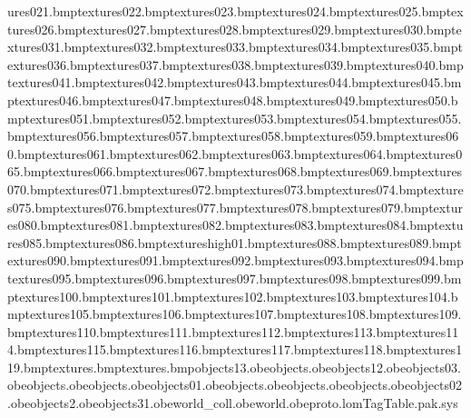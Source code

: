 ures\tstbg021.bmp textures\tstbg022.bmp textures\tstbg023.bmp textures\tstbg024.bmp textures\tstbg025.bmp textures\tstbg026.bmp textures\tstbg027.bmp textures\tstbg028.bmp textures\tstbg029.bmp textures\tstbg030.bmp textures\tstbg031.bmp textures\tstbg032.bmp textures\tstbg033.bmp textures\tstbg034.bmp textures\tstbg035.bmp textures\tstbg036.bmp textures\tstbg037.bmp textures\tstbg038.bmp textures\tstbg039.bmp textures\tstbg040.bmp textures\tstbg041.bmp textures\tstbg042.bmp textures\tstbg043.bmp textures\tstbg044.bmp textures\tstbg045.bmp textures\tstbg046.bmp textures\tstbg047.bmp textures\tstbg048.bmp textures\tstbg049.bmp textures\tstbg050.bmp textures\tstbg051.bmp textures\tstbg052.bmp textures\tstbg053.bmp textures\tstbg054.bmp textures\tstbg055.bmp textures\tstbg056.bmp textures\tstbg057.bmp textures\tstbg058.bmp textures\tstbg059.bmp textures\tstbg060.bmp textures\tstbg061.bmp textures\tstbg062.bmp textures\tstbg063.bmp textures\tstbg064.bmp textures\tstbg065.bmp textures\tstbg066.bmp textures\tstbg067.bmp textures\tstbg068.bmp textures\tstbg069.bmp textures\tstbg070.bmp textures\tstbg071.bmp textures\tstbg072.bmp textures\tstbg073.bmp textures\tstbg074.bmp textures\tstbg075.bmp textures\tstbg076.bmp textures\tstbg077.bmp textures\tstbg078.bmp textures\tstbg079.bmp textures\tstbg080.bmp textures\tstbg081.bmp textures\tstbg082.bmp textures\tstbg083.bmp textures\tstbg084.bmp textures\tstbg085.bmp textures\tstbg086.bmp textures\3high01.bmp textures\tstbg088.bmp textures\tstbg089.bmp textures\tstbg090.bmp textures\tstbg091.bmp textures\tstbg092.bmp textures\tstbg093.bmp textures\tstbg094.bmp textures\tstbg095.bmp textures\tstbg096.bmp textures\tstbg097.bmp textures\tstbg098.bmp textures\tstbg099.bmp textures\tstbg100.bmp textures\tstbg101.bmp textures\tstbg102.bmp textures\tstbg103.bmp textures\tstbg104.bmp textures\tstbg105.bmp textures\tstbg106.bmp textures\tstbg107.bmp textures\tstbg108.bmp textures\tstbg109.bmp textures\tstbg110.bmp textures\tstbg111.bmp textures\tstbg112.bmp textures\tstbg113.bmp textures\tstbg114.bmp textures\tstbg115.bmp textures\tstbg116.bmp textures\tstbg117.bmp textures\tstbg118.bmp textures\tstbg119.bmp textures\wanted.bmp textures\wantedwood.bmp objects\box13.obe objects\rock.obe objects\box12.obe objects\box03.obe objects\motion.obe objects\gate.obe objects\box01.obe objects\palmlar.obe objects\palmmed.obe objects\palmsmall.obe objects\box02.obe objects\signwanted2.obe objects\box31.obe world_coll.obe world.obe proto.lom TagTable.pak.sys 